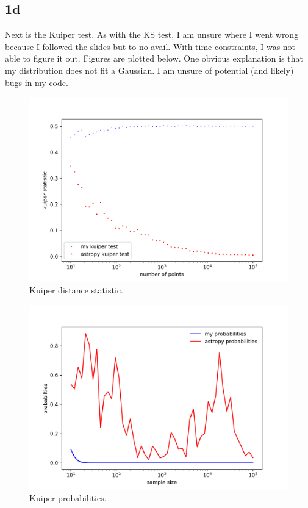 \subsection{1d}


Next is the Kuiper test. As with the KS test, I am unsure where I went wrong
because I followed the slides but to no avail. With time constraints, 
I was not able to figure it out. Figures are plotted below. One obvious 
explanation is that my distribution does not fit a Gaussian.
I am unsure of potential (and likely) bugs in my code.
\begin{figure}[h!]
    \centering
    \includegraphics[width=0.9\linewidth]{./plots/kuiper_stat.png}
    \caption{Kuiper distance statistic.}
    \label{kuip_s}
\end{figure}

\begin{figure}[h!]
    \centering
    \includegraphics[width=0.9\linewidth]{./plots/k_prob.png}
    \caption{Kuiper probabilities.}
    \label{kuip_p}
\end{figure}

